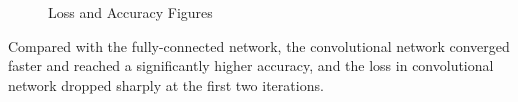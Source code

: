 \documentclass[11pt]{article} \usepackage{fullpage} \usepackage{graphicx} \usepackage{epstopdf} \usepackage{color} \usepackage{psfrag} \usepackage{pdfsync}\usepackage{indentfirst}\usepackage{subfigure}\usepackage{float}\usepackage[section]{placeins}
\begin{document}
\begin{figure}[H]
\centering
{}
\caption{Loss and Accuracy Figures}
\end{figure}

Compared with the fully-connected network, the convolutional network converged faster and reached a significantly higher accuracy, and the loss in convolutional network dropped sharply at the first two iterations.
\end{document}
